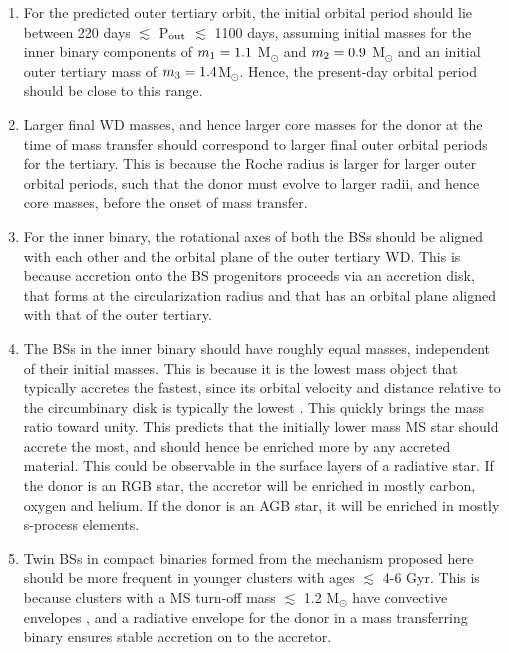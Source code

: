 \documentclass{aastex62}
\def\simon#1{{\bf {\color{red}[#1 -- Simon]}}}
\begin{document}
\begin{enumerate}

\item For the predicted outer tertiary orbit, the initial 
  orbital period should lie between 220 days $\lesssim$ P$_{\rm out}$
  $\lesssim$ 1100 days, assuming initial masses for the inner binary
  components of $m_{\rm 1} = 1.1$ M$_{\odot}$ and $m_{\rm 2} = 0.9$
  M$_{\odot}$ and an initial outer tertiary mass of $m_{\rm 3} = 1.4
  $M$_{\odot}$.  Hence, the present-day orbital period should be close to this range.

\item Larger final WD masses, and hence larger core masses for the donor at
  the time of mass transfer should correspond to larger final outer
  orbital periods for the tertiary.  This is because the Roche radius
  is larger for larger outer orbital periods, such that the donor must
  evolve to larger radii, and hence core masses, before the onset of
  mass transfer.

\item For the inner binary, the rotational axes of both the BSs should
  be aligned with each other and the orbital plane of the outer
  tertiary WD.  This is because accretion onto the BS progenitors
  proceeds via an accretion disk, that forms at the circularization
  radius and that has an orbital plane aligned with that of the outer
  tertiary.

\item The BSs in the inner binary should have roughly equal masses,
  independent of their initial masses.  This is because it is the
  lowest mass object that typically accretes the fastest, since its
  orbital velocity and distance relative to the circumbinary disk is
  typically the lowest
  \citep[e.g.][]{1995MNRAS.277.1491K,1997MNRAS.285...33B,2000MNRAS.314...33B}.
  This quickly brings the mass ratio toward unity.  This predicts that
  the initially lower mass MS star should accrete the most, and should
  hence be enriched more by any accreted material.  This could be
  observable in the surface layers of a radiative star.  If the donor
  is an RGB star, the accretor will be enriched in mostly carbon,
  oxygen and helium.  If the donor is an AGB star, it will be enriched
  in mostly s-process elements.

\item Twin BSs in compact binaries formed from the mechanism proposed here 
  should be more frequent in younger clusters with ages $\lesssim$ 4-6
  Gyr.  This is because clusters with a MS turn-off mass
  $\lesssim$ 1.2 M$_{\odot}$ have convective envelopes
  \citep[e.g.][]{1991ApJS...76...55I,2009pfer.book.....M}, and a radiative envelope for the
  donor in a mass transferring binary ensures stable accretion on to
  the accretor.  %

\end{enumerate}
\end{document}
